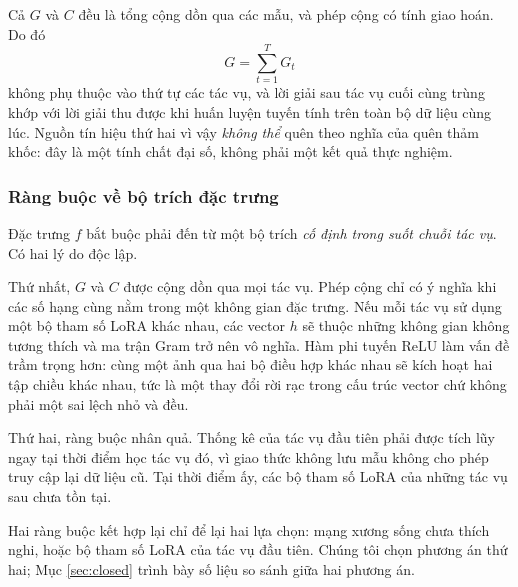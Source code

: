 \documentclass[11pt,a4paper]{article}
\begin{document}
Cả $G$ và $C$ đều là tổng cộng dồn qua các mẫu, và phép cộng có tính giao hoán.
Do đó
\begin{equation}
G = \sum_{t=1}^{T} G_t
\end{equation}
không phụ thuộc vào thứ tự các tác vụ, và lời giải sau tác vụ cuối cùng trùng
khớp với lời giải thu được khi huấn luyện tuyến tính trên toàn bộ dữ liệu cùng
lúc. Nguồn tín hiệu thứ hai vì vậy \emph{không thể} quên theo nghĩa của quên thảm
khốc: đây là một tính chất đại số, không phải một kết quả thực nghiệm.

\subsubsection{Ràng buộc về bộ trích đặc trưng}
\label{sec:fixed-extractor}

Đặc trưng $f$ bắt buộc phải đến từ một bộ trích \emph{cố định trong suốt chuỗi
tác vụ}. Có hai lý do độc lập.

Thứ nhất, $G$ và $C$ được cộng dồn qua mọi tác vụ. Phép cộng chỉ có ý nghĩa khi
các số hạng cùng nằm trong một không gian đặc trưng. Nếu mỗi tác vụ sử dụng một
bộ tham số LoRA khác nhau, các vector $h$ sẽ thuộc những không gian không tương
thích và ma trận Gram trở nên vô nghĩa. Hàm phi tuyến ReLU làm vấn đề trầm trọng
hơn: cùng một ảnh qua hai bộ điều hợp khác nhau sẽ kích hoạt hai tập chiều khác
nhau, tức là một thay đổi rời rạc trong cấu trúc vector chứ không phải một sai
lệch nhỏ và đều.

Thứ hai, ràng buộc nhân quả. Thống kê của tác vụ đầu tiên phải được tích lũy ngay
tại thời điểm học tác vụ đó, vì giao thức không lưu mẫu không cho phép truy cập
lại dữ liệu cũ. Tại thời điểm ấy, các bộ tham số LoRA của những tác vụ sau chưa
tồn tại.

Hai ràng buộc kết hợp lại chỉ để lại hai lựa chọn: mạng xương sống chưa thích
nghi, hoặc bộ tham số LoRA của tác vụ đầu tiên. Chúng tôi chọn phương án thứ hai;
Mục \ref{sec:closed} trình bày số liệu so sánh giữa hai phương án.
\end{document}
